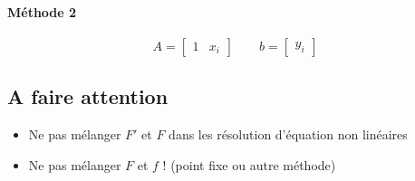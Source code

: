 \documentclass[resume]{subfiles}
\begin{document}
\paragraph{Méthode 2}
$$A=\begin{bmatrix}
1 & x_i
\end{bmatrix}\qquad b=\begin{bmatrix}
y_i
\end{bmatrix}$$



\subsection{A faire attention}
\begin{mdframed}[linewidth=2pt, linecolor=OrangeRed]
\begin{itemize}
\item Ne pas mélanger $F'$ et $F$ dans les résolution d'équation non linéaires
\item Ne pas mélanger $F$ et $f$ ! (point fixe ou autre méthode)
\end{itemize}
\end{mdframed}
\end{document}
